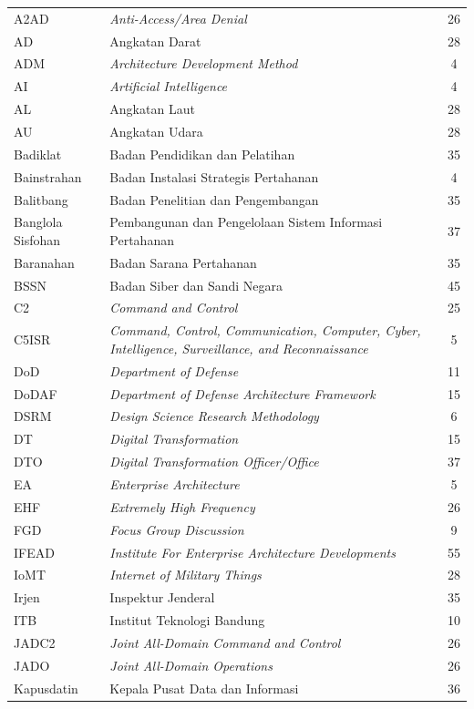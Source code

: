 \begin{longtable}{@{} l >{\raggedright\arraybackslash}p{7.5cm} c @{}}
A2AD & \textit{Anti-Access/Area Denial} & 26 \\
AD & Angkatan Darat & 28 \\
ADM & \textit{Architecture Development Method} & 4 \\
AI & \textit{Artificial Intelligence} & 4 \\
AL & Angkatan Laut & 28 \\
AU & Angkatan Udara & 28 \\
Badiklat & Badan Pendidikan dan Pelatihan & 35 \\
Bainstrahan & Badan Instalasi Strategis Pertahanan & 4 \\
Balitbang & Badan Penelitian dan Pengembangan & 35 \\
Banglola Sisfohan & Pembangunan dan Pengelolaan Sistem Informasi Pertahanan & 37 \\
Baranahan & Badan Sarana Pertahanan & 35 \\
BSSN & Badan Siber dan Sandi Negara & 45 \\
C2 & \textit{Command and Control} & 25 \\
C5ISR & \textit{Command, Control, Communication, Computer, Cyber, Intelligence, Surveillance, and Reconnaissance} & 5 \\
DoD & \textit{Department of Defense} & 11 \\
DoDAF & \textit{Department of Defense Architecture Framework} & 15 \\
DSRM & \textit{Design Science Research Methodology} & 6 \\
DT & \textit{Digital Transformation} & 15 \\
DTO & \textit{Digital Transformation Officer/Office} & 37 \\
EA & \textit{Enterprise Architecture} & 5 \\
EHF & \textit{Extremely High Frequency} & 26 \\
FGD & \textit{Focus Group Discussion} & 9 \\
IFEAD & \textit{Institute For Enterprise Architecture Developments} & 55 \\
IoMT & \textit{Internet of Military Things} & 28 \\
Irjen & Inspektur Jenderal & 35 \\
ITB & Institut Teknologi Bandung & 10 \\
JADC2 & \textit{Joint All-Domain Command and Control} & 26 \\
JADO & \textit{Joint All-Domain Operations} & 26 \\
Kapusdatin & Kepala Pusat Data dan Informasi & 36 \\

\end{longtable}

